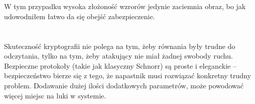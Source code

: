 \documentclass{article}
\begin{document}
\section{}
W tym przypadku wysoka złożoność wzrorów jedynie zaciemnia obraz, bo jak udowodniłem łatwo da się obejść zabezpieczenie.

\section{}
Skuteczność kryptografii nie polega na tym, żeby równania były trudne do odczytania, tylko na tym, żeby atakujący nie miał żadnej swobody ruchu. Bezpieczne protokoły (takie jak klasyczny Schnorr) są proste i eleganckie – bezpieczeństwo bierze się z tego, że napastnik musi rozwiązać konkretny trudny problem. Dodawanie dużej ilości dodatkowych parametrów, może powodować więcej miejsc na luki w systemie.
\end{document}
